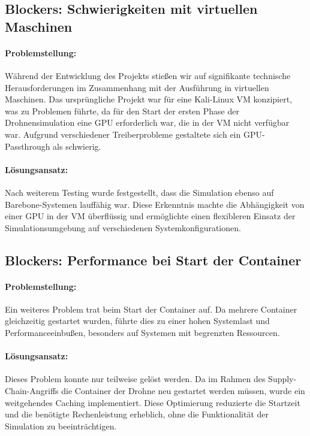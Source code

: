 \documentclass[12pt]{scrartcl}
\begin{document}
        \subsection{Blockers: Schwierigkeiten mit virtuellen Maschinen}
        
        \paragraph{Problemstellung:}
        Während der Entwicklung des Projekts stießen wir auf signifikante technische Herausforderungen im Zusammenhang mit der Ausführung in virtuellen Maschinen. Das ursprüngliche Projekt war für eine Kali-Linux VM konzipiert, was zu Problemen führte, da für den Start der ersten Phase der Drohnensimulation eine GPU erforderlich war, die in der VM nicht verfügbar war. Aufgrund verschiedener Treiberprobleme gestaltete sich ein GPU-Passthrough als schwierig.
        
        \paragraph{Lösungsansatz:}
        Nach weiterem Testing wurde festgestellt, dass die Simulation ebenso auf Barebone-Systemen lauffähig war. Diese Erkenntnis machte die Abhängigkeit von einer GPU in der VM überflüssig und ermöglichte einen flexibleren Einsatz der Simulationsumgebung auf verschiedenen Systemkonfigurationen.
        
        \subsection{Blockers: Performance bei Start der Container}

        \paragraph{Problemstellung:}
        Ein weiteres Problem trat beim Start der Container auf. Da mehrere Container gleichzeitig gestartet wurden, führte dies zu einer hohen Systemlast und Performanceeinbußen, besonders auf Systemen mit begrenzten Ressourcen.
        
        \paragraph{Lösungsansatz:}
        Dieses Problem konnte nur teilweise gelöst werden. Da im Rahmen des Supply-Chain-Angriffs die Container der Drohne neu gestartet werden müssen, wurde ein weitgehendes Caching implementiert. Diese Optimierung reduzierte die Startzeit und die benötigte Rechenleistung erheblich, ohne die Funktionalität der Simulation zu beeinträchtigen.
\end{document}

